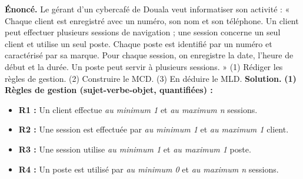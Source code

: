 \documentclass[11pt]{article}
\begin{document}
\begin{exoresolu}
\textbf{Énoncé.} Le gérant d'un cybercafé de Douala veut informatiser son activité : « Chaque client est enregistré avec un numéro, son nom et son téléphone. Un client peut effectuer plusieurs sessions de navigation ; une session concerne un seul client et utilise un seul poste. Chaque poste est identifié par un numéro et caractérisé par sa marque. Pour chaque session, on enregistre la date, l'heure de début et la durée. Un poste peut servir à plusieurs sessions. »
(1) Rédiger les règles de gestion. (2) Construire le MCD. (3) En déduire le MLD.
\tcblower
\textbf{Solution.}
\textbf{(1) Règles de gestion (sujet-verbe-objet, quantifiées) :}
\begin{itemize}
\item \textbf{R1 :} Un client effectue \emph{au minimum 1} et \emph{au maximum n} sessions.
\item \textbf{R2 :} Une session est effectuée par \emph{au minimum 1} et \emph{au maximum 1} client.
\item \textbf{R3 :} Une session utilise \emph{au minimum 1} et \emph{au maximum 1} poste.
\item \textbf{R4 :} Un poste est utilisé par \emph{au minimum 0} et \emph{au maximum n} sessions.
\end{itemize}


\end{exoresolu}
\end{document}
